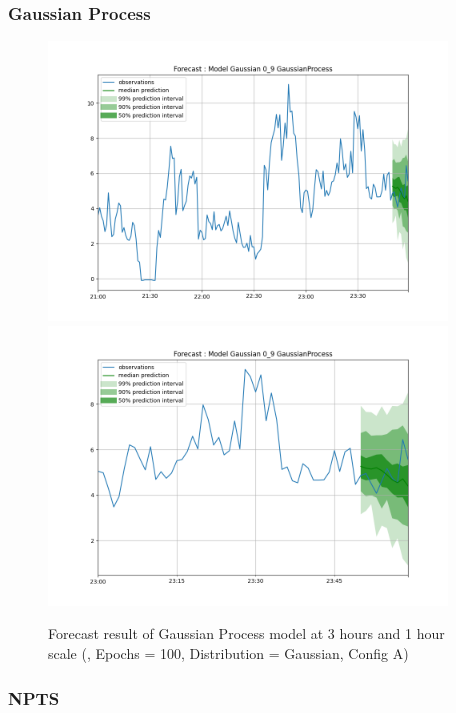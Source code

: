 \subsubsection{Gaussian Process} \label{comp_gp}

\begin{figure}[H]
    \centering
    \includegraphics[width=400px]{plots/forecast/a/model/Gaussian/0_9/GaussianProcess/180.png}
    \includegraphics[width=400px]{plots/forecast/a/model/Gaussian/0_9/GaussianProcess/60.png}
    \caption{Forecast result of Gaussian Process model at 3 hours and 1 hour scale (, Epochs = 100, Distribution = Gaussian, Config A)}
    \label{fig:gp}
\end{figure}


\subsubsection{NPTS} \label{comp_npts}

